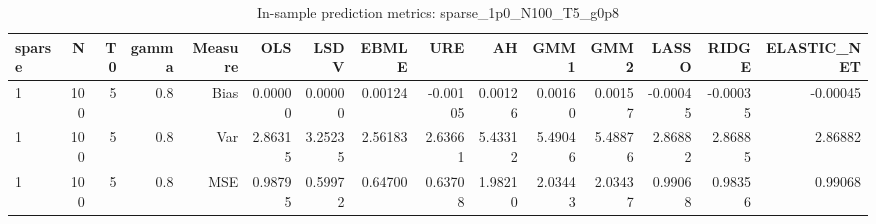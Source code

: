 \begin{table}[!htbp]\centering
\caption{In-sample prediction metrics: sparse_1p0_N100_T5_g0p8}
\label{tab:table2_sparse_1p0_N100_T5_g0p8}
\begin{tabular}{lrrrrrrrrrrrrrr}
\hline
sparse & N & T0 & gamma & Measure & OLS & LSDV & EBMLE & URE & AH & GMM1 & GMM2 & LASSO & RIDGE & ELASTIC_NET \\
\hline
1 & 100 & 5 & 0.8 & Bias & 0.00000 & 0.00000 & 0.00124 & -0.00105 & 0.00126 & 0.00160 & 0.00157 & -0.00045 & -0.00035 & -0.00045 \\
1 & 100 & 5 & 0.8 & Var & 2.86315 & 3.25235 & 2.56183 & 2.63661 & 5.43312 & 5.49046 & 5.48876 & 2.86882 & 2.86885 & 2.86882 \\
1 & 100 & 5 & 0.8 & MSE & 0.98795 & 0.59972 & 0.64700 & 0.63708 & 1.98210 & 2.03443 & 2.03437 & 0.99068 & 0.98356 & 0.99068 \\
\hline
\end{tabular}
\end{table}

